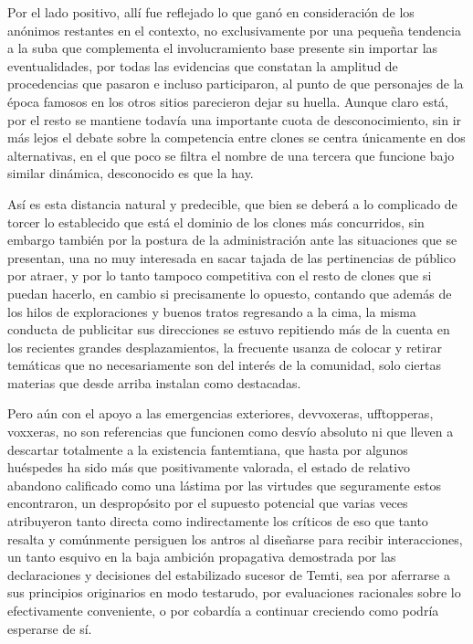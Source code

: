 \documentclass[
]{book}
\begin{document}
Por el lado positivo, allí fue reflejado lo que ganó en consideración de los anónimos restantes en el contexto, no exclusivamente por una pequeña tendencia a la suba que complementa el involucramiento base presente sin importar las eventualidades, por todas las evidencias que constatan la amplitud de procedencias que pasaron e incluso participaron, al punto de que personajes de la época famosos en los otros sitios parecieron dejar su huella. Aunque claro está, por el resto se mantiene todavía una importante cuota de desconocimiento, sin ir más lejos el debate sobre la competencia entre clones se centra únicamente en dos alternativas, en el que poco se filtra el nombre de una tercera que funcione bajo similar dinámica, desconocido es que la hay.

Así es esta distancia natural y predecible, que bien se deberá a lo complicado de torcer lo establecido que está el dominio de los clones más concurridos, sin embargo también por la postura de la administración ante las situaciones que se presentan, una no muy interesada en sacar tajada de las pertinencias de público por atraer, y por lo tanto tampoco competitiva con el resto de clones que si puedan hacerlo, en cambio si precisamente lo opuesto, contando que además de los hilos de exploraciones y buenos tratos regresando a la cima, la misma conducta de publicitar sus direcciones se estuvo repitiendo más de la cuenta en los recientes grandes desplazamientos, la frecuente usanza de colocar y retirar temáticas que no necesariamente son del interés de la comunidad, solo ciertas materias que desde arriba instalan como destacadas.

Pero aún con el apoyo a las emergencias exteriores, devvoxeras, ufftopperas, voxxeras, no son referencias que funcionen como desvío absoluto ni que lleven a descartar totalmente a la existencia fantemtiana, que hasta por algunos huéspedes ha sido más que positivamente valorada, el estado de relativo abandono calificado como una lástima por las virtudes que seguramente estos encontraron, un despropósito por el supuesto potencial que varias veces atribuyeron tanto directa como indirectamente los críticos de eso que tanto resalta y comúnmente persiguen los antros al diseñarse para recibir interacciones, un tanto esquivo en la baja ambición propagativa demostrada por las declaraciones y decisiones del estabilizado sucesor de Temti, sea por aferrarse a sus principios originarios en modo testarudo, por evaluaciones racionales sobre lo efectivamente conveniente, o por cobardía a continuar creciendo como podría esperarse de sí.
\end{document}
